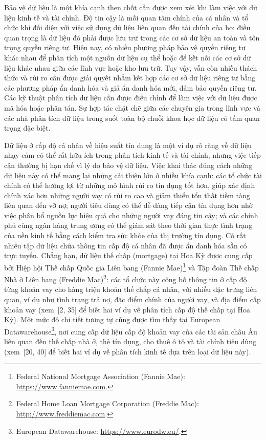 Bảo vệ dữ liệu là một khía cạnh then chốt cần được xem xét khi làm việc với dữ liệu kinh tế và tài chính. Độ tin cậy là mối quan tâm chính của cá nhân và tổ chức khi đối diện với việc sử dụng dữ liệu liên quan đến tài chính của họ: điều quan trọng là dữ liệu đó phải được lưu trữ trong các cơ sở dữ liệu an toàn và tôn trọng quyền riêng tư. Hiện nay, có nhiều phương pháp bảo vệ quyền riêng tư khác nhau để phân tích một nguồn dữ liệu cụ thể hoặc để kết nối các cơ sở dữ liệu khác nhau giữa các lĩnh vực hoặc kho lưu trữ. Tuy vậy, vẫn còn nhiều thách thức và rủi ro cần được giải quyết nhằm kết hợp các cơ sở dữ liệu riêng tư bằng các phương pháp ẩn danh hóa và giả ẩn danh hóa mới, đảm bảo quyền riêng tư. Các kỹ thuật phân tích dữ liệu cần được điều chỉnh để làm việc với dữ liệu được mã hóa hoặc phân tán. Sự hợp tác chặt chẽ giữa các chuyên gia trong lĩnh vực và các nhà phân tích dữ liệu trong suốt toàn bộ chuỗi khoa học dữ liệu có tầm quan trọng đặc biệt.

Dữ liệu ở cấp độ cá nhân về hiệu suất tín dụng là một ví dụ rõ ràng về dữ liệu nhạy cảm có thể rất hữu ích trong phân tích kinh tế và tài chính, nhưng việc tiếp cận thường bị hạn chế vì lý do bảo vệ dữ liệu. Việc khai thác đúng cách những dữ liệu này có thể mang lại những cải thiện lớn ở nhiều khía cạnh: các tổ chức tài chính có thể hưởng lợi từ những mô hình rủi ro tín dụng tốt hơn, giúp xác định chính xác hơn những người vay có rủi ro cao và giảm thiểu tổn thất tiềm tàng liên quan đến vỡ nợ; người tiêu dùng có thể dễ dàng tiếp cận tín dụng hơn nhờ việc phân bổ nguồn lực hiệu quả cho những người vay đáng tin cậy; và các chính phủ cùng ngân hàng trung ương có thể giám sát theo thời gian thực tình trạng của nền kinh tế bằng cách kiểm tra sức khỏe của thị trường tín dụng. Có rất nhiều tập dữ liệu chứa thông tin cấp độ cá nhân đã được ẩn danh hóa sẵn có trực tuyến. Chẳng hạn, dữ liệu thế chấp (mortgage) tại Hoa Kỳ được cung cấp bởi Hiệp hội Thế chấp Quốc gia Liên bang (Fannie Mae)\footnote{Federal National Mortgage Association (Fannie Mae): \url{https://www.fanniemae.com}.} và Tập đoàn Thế chấp Nhà ở Liên bang (Freddie Mac)\footnote{Federal Home Loan Mortgage Corporation (Freddie Mac): \url{http://www.freddiemac.com}.}: các tổ chức này công bố thông tin ở cấp độ từng khoản vay cho hàng triệu khoản thế chấp cá nhân, với nhiều đặc trưng liên quan, ví dụ như tình trạng trả nợ, đặc điểm chính của người vay, và địa điểm cấp khoản vay (xem~[2, 35] để biết hai ví dụ về phân tích cấp độ thế chấp tại Hoa Kỳ). Một mức độ chi tiết tương tự cũng được tìm thấy tại European Datawarehouse\footnote{European Datawarehouse: \url{https://www.eurodw.eu/}.}, nơi cung cấp dữ liệu cấp độ khoản vay của các tài sản châu Âu liên quan đến thế chấp nhà ở, thẻ tín dụng, cho thuê ô tô và tài chính tiêu dùng (xem~[20, 40] để biết hai ví dụ về phân tích kinh tế dựa trên loại dữ liệu này).

